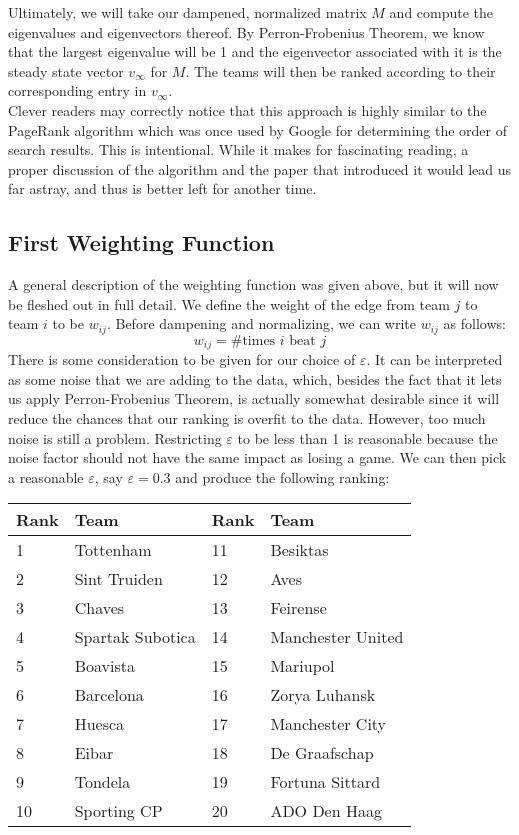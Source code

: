 \documentclass[10pt]{article}
\begin{document}
Ultimately, we will take our dampened, normalized matrix $M$ and compute the eigenvalues and eigenvectors thereof. By Perron-Frobenius Theorem, we know that the largest eigenvalue will be 1 and the eigenvector associated with it is the steady state vector $v_\infty$ for $M$. The teams will then be ranked according to their corresponding entry in $v_\infty$. \vspace{0.5cm}\\
Clever readers may correctly notice that this approach is highly similar to the PageRank algorithm which was once used by Google for determining the order of search results. This is intentional. While it makes for fascinating reading, a proper discussion of the algorithm and the paper that introduced it would lead us far astray, and thus is better left for another time.
\subsection{First Weighting Function}
A general description of the weighting function was given above, but it will now be fleshed out in full detail. We define the weight of the edge from team $j$ to team $i$ to be $w_{ij}$. Before dampening and normalizing, we can write $w_{ij}$ as follows:
\[w_{ij} = \text{\# times $i$ beat $j$}\]
There is some consideration to be given for our choice of $\varepsilon$. It can be interpreted as some noise that we are adding to the data, which, besides the fact that it lets us apply Perron-Frobenius Theorem, is actually somewhat desirable since it will reduce the chances that our ranking is overfit to the data. However, too much noise is still a problem. Restricting $\varepsilon$ to be less than 1 is reasonable because the noise factor should not have the same impact as losing a game. We can then pick a reasonable $\varepsilon$, say $\varepsilon=0.3$ and produce the following ranking:
\begin{table}[h!]
\centering
\begin{tabular}{ll|ll}
Rank & Team             & Rank & Team              \\ \hline
1    & Tottenham        & 11   & Besiktas          \\
2    & Sint Truiden     & 12   & Aves              \\
3    & Chaves           & 13   & Feirense          \\
4    & Spartak Subotica & 14   & Manchester United \\
5    & Boavista         & 15   & Mariupol          \\
6    & Barcelona        & 16   & Zorya Luhansk     \\
7    & Huesca           & 17   & Manchester City   \\
8    & Eibar            & 18   & De Graafschap     \\
9    & Tondela          & 19   & Fortuna Sittard   \\
10   & Sporting CP      & 20   & ADO Den Haag     
\end{tabular}
\end{table}\\
\end{document}
